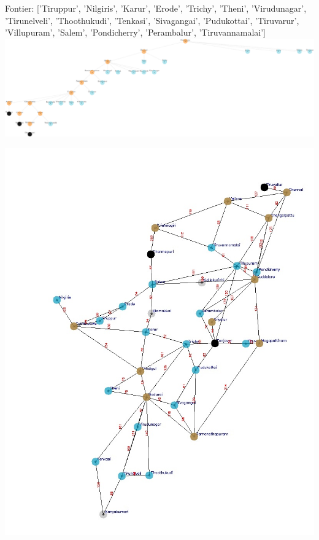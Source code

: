 \documentclass[xcolor=table]{beamer}
\begin{document}
\begin{frame}
  { \tiny Fontier: ['Tiruppur', 'Nilgiris', 'Karur', 'Erode', 'Trichy', 'Theni', 'Virudunagar', 'Tirunelveli', 'Thoothukudi', 'Tenkasi', 'Sivagangai', 'Pudukottai', 'Tiruvarur', 'Villupuram', 'Salem', 'Pondicherry', 'Perambalur', 'Tiruvannamalai']}
  \includegraphics[width=1\textwidth]{../DFSNodes/19-1.png}
  \begin{center}
    \includegraphics[height=0.45\textheight]{../DFSoutput/tamilDFS17.jpg}
  \end{center}
\end{frame}
\end{document}
